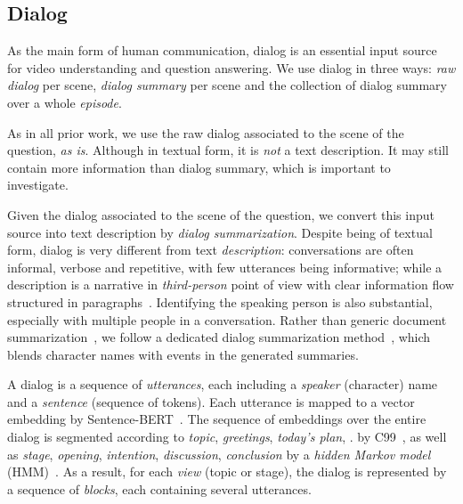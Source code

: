 \documentclass[10pt,twocolumn,letterpaper]{article}
\makeatletter
\renewcommand\paragraph{\@startsection{paragraph}{4}{\z@}{1ex}{-1em}{\normalfont\normalsize\bfseries}}
\makeatother
\begin{document}
\subsection{Dialog}
\label{sec:dialog}

As the main form of human communication, dialog is an essential input source for video understanding and question answering. We use dialog in three ways: \emph{raw dialog} per scene, \emph{dialog summary} per scene and the collection of dialog summary over a whole \emph{episode}.



\paragraph{Raw scene dialog}

As in all prior work, we use the raw dialog associated to the scene of the question, \emph{as is}. Although in textual form, it is \emph{not} a text description. It may still contain more information than dialog summary, which is important to investigate.



\paragraph{\up[\sceneSum]}

Given the dialog associated to the scene of the question, we convert this input source into text description by \emph{dialog summarization}. Despite being of textual form, dialog is very different from text \emph{description}: conversations are often informal, verbose and repetitive, with few utterances being informative; while a description is a narrative in \emph{third-person} point of view with clear information flow structured in paragraphs~\cite{chen2020multi}. Identifying the speaking person is also substantial, especially with multiple people in a conversation. Rather than generic document summarization~\cite{gliwa2019samsum}, we follow a dedicated dialog summarization method~\cite{chen2020multi}, which blends character names with events in the generated summaries.

A dialog is a sequence of \emph{utterances}, each including a \emph{speaker} (character) name and a \emph{sentence} (sequence of tokens). Each utterance is mapped to a vector embedding by Sentence-BERT~\cite{reimers-gurevych-2019-sentence}. The sequence of embeddings over the entire dialog is segmented according to  \emph{topic}, \eg \emph{greetings}, \emph{today's plan}, \etc. by C99~\cite{C99-choi-2000-advances}, as well as \emph{stage}, \eg \emph{opening}, \emph{intention}, \emph{discussion}, \emph{conclusion} by a \emph{hidden Markov model} (HMM)~\cite{althoff2016large}. As a result, for each \emph{view} (topic or stage), the dialog is represented by a sequence of \emph{blocks}, each containing several utterances.
\end{document}
